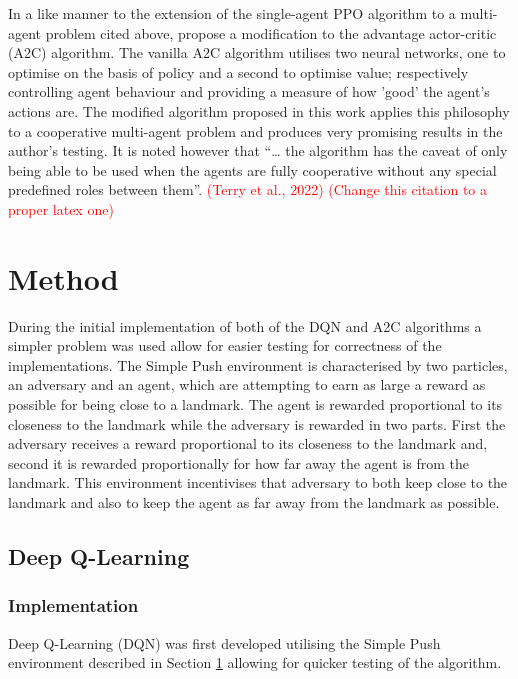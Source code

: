 \documentclass{article}
\begin{document}
In a like manner to the extension of the single-agent PPO algorithm to a multi-agent problem cited above, \citet{9263738} propose a modification to the advantage actor-critic (A2C) algorithm.
The vanilla A2C algorithm utilises two neural networks, one to optimise on the basis of policy and a second to optimise value; respectively controlling agent behaviour and providing a measure of how 'good' the agent's actions are.
The modified algorithm proposed in this work applies this philosophy to a cooperative multi-agent problem and produces very promising results in the author's testing.
It is noted however that “… the algorithm has the caveat of only being able to be used when the agents are fully cooperative without any special predefined roles between them”. \textcolor{red}{(Terry et al., 2022) (Change this citation to a proper latex one)}

\section{Method} \label{Method}

During the initial implementation of both of the DQN and A2C algorithms a simpler problem was used allow for easier testing for correctness of the implementations.
The Simple Push environment is characterised by two particles, an adversary and an agent, which are attempting to earn as large a reward as possible for being close to a landmark.
The agent is rewarded proportional to its closeness to the landmark while the adversary is rewarded in two parts.
First the adversary receives a reward proportional to its closeness to the landmark and, second it is rewarded proportionally for how far away the agent is from the landmark.
This environment incentivises that adversary to both keep close to the landmark and also to keep the agent as far away from the landmark as possible.



\subsection{Deep Q-Learning} \label{DQN-Method}

\subsubsection{Implementation} \label{DQN-Implementation}

Deep Q-Learning (DQN) was first developed utilising the Simple Push environment described in Section \ref{Method} allowing for quicker testing of the algorithm.
\end{document}
